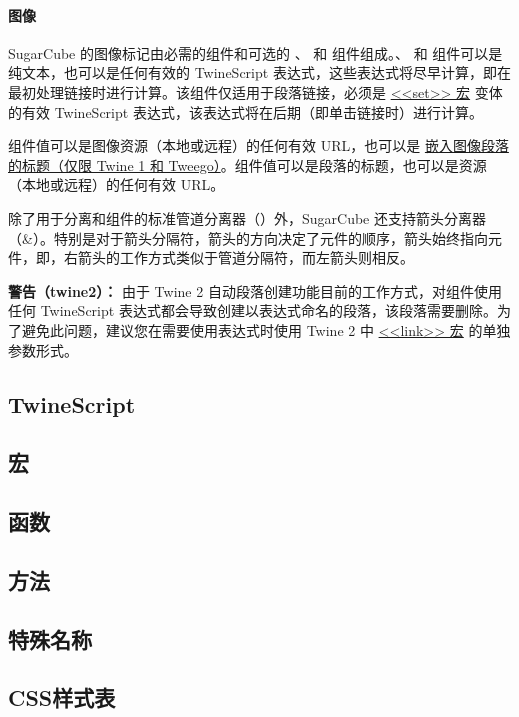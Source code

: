 \documentclass[hyperref,UTF8]{ctexart}
\begin{document}
\paragraph{图像}
SugarCube 的图像标记由必需的组件和可选的 、 和 组件组成。、 和 组件可以是纯文本，也可以是任何有效的 TwineScript 表达式，这些表达式将尽早计算，即在最初处理链接时进行计算。该组件仅适用于段落链接，必须是 \href{https://www.motoslave.net/sugarcube/2/docs/#macros-macro-set}{<<set>> 宏} 变体的有效 TwineScript 表达式，该表达式将在后期（即单击链接时）进行计算。

组件值可以是图像资源（本地或远程）的任何有效 URL，也可以是 \href{http://twinery.org/wiki/image}{嵌入图像段落的标题（仅限 Twine 1 和 Tweego）}。组件值可以是段落的标题，也可以是资源（本地或远程）的任何有效 URL。

除了用于分离和组件的标准管道分离器（）外，SugarCube 还支持箭头分离器 （\&）。特别是对于箭头分隔符，箭头的方向决定了元件的顺序，箭头始终指向元件，即，右箭头的工作方式类似于管道分隔符，而左箭头则相反。

\textbf{警告（twine2）：} 由于 Twine 2 自动段落创建功能目前的工作方式，对组件使用任何 TwineScript 表达式都会导致创建以表达式命名的段落，该段落需要删除。为了避免此问题，建议您在需要使用表达式时使用 Twine 2 中 \href{https://www.motoslave.net/sugarcube/2/docs/#macros-macro-link}{<<link>> 宏} 的单独参数形式。

\newpage
\subsection{TwineScript}

\newpage
\subsection{宏}

\newpage
\subsection{函数}

\newpage
\subsection{方法}

\newpage
\subsection{特殊名称}

\newpage
\subsection{CSS样式表}
\end{document}
